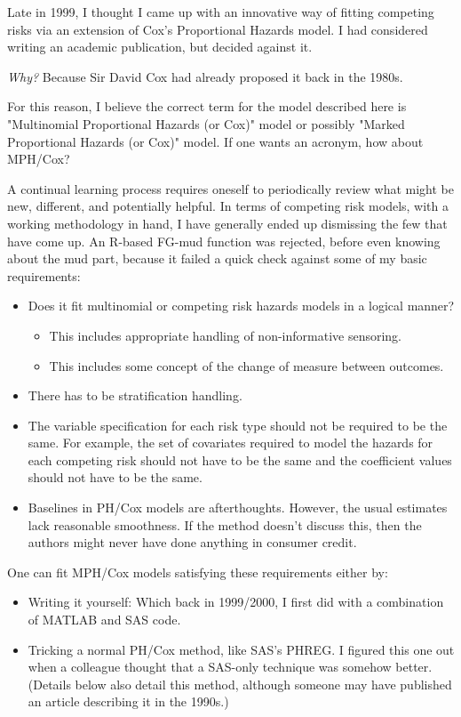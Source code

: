 \documentclass[10pt]{article}
\begin{document}
Late in 1999, I thought I came up with an innovative way 
of fitting competing risks via an extension of Cox's
Proportional Hazards model.   I had considered writing an academic publication,  but decided against it.  
\begin{center}
    {\em Why?}  Because Sir David Cox had already proposed it back in the 1980s. 
\end{center}
For this reason, I believe the correct term for the model described here is "Multinomial Proportional Hazards (or Cox)" model
or possibly "Marked Proportional Hazards (or Cox)" model.  If one wants an acronym, how about MPH/Cox?

A continual learning process requires oneself to 
periodically review what might be new, different, and potentially helpful.
In terms of competing risk models, with a working methodology in hand, I have generally ended up dismissing 
the few that have come up.  
An R-based FG-mud function was rejected, before even knowing about the mud part, because it failed 
a quick check against some of my basic requirements:
\begin{itemize}
\item Does it fit multinomial or competing risk hazards models in a logical manner?
\begin{itemize}
\item This includes appropriate handling of non-informative sensoring.
\item This includes some concept of the change of measure between outcomes.
\end{itemize}
\item There has to be stratification handling. 
\item The variable specification for each risk type should not be required to be the same.
For example, the set of covariates required to model the hazards for each competing risk should
not have to be the same and the coefficient values should not have to be the same.
\item Baselines in PH/Cox models are afterthoughts. However, the usual estimates 
    lack reasonable smoothness.  If the method doesn't discuss this, then the authors might 
    never have done anything in consumer credit.
\end{itemize}

One can fit MPH/Cox models satisfying these requirements either by:
\begin{itemize}
\item Writing it yourself: Which back in 1999/2000, I first did with a combination of MATLAB and SAS code.
\item Tricking a normal PH/Cox method, like SAS's PHREG.  I figured this one out when a colleague thought that a SAS-only technique
was somehow better.   (Details below also detail this method, although someone may have published an 
article describing it in the 1990s.)
\end{itemize}
\end{document}
